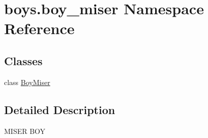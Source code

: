 \hypertarget{namespaceboys_1_1boy__miser}{}\section{boys.\+boy\+\_\+miser Namespace Reference}
\label{namespaceboys_1_1boy__miser}
\subsection*{Classes}
\begin{DoxyCompactItemize}
\item 
class \hyperlink{classboys_1_1boy__miser_1_1_boy_miser}{Boy\+Miser}
\end{DoxyCompactItemize}


\subsection{Detailed Description}
\begin{DoxyVerb}MISER BOY\end{DoxyVerb}
 